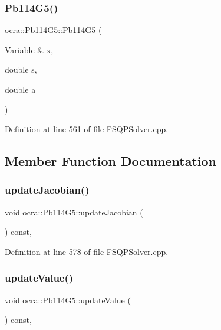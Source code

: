 \subsubsection{\texorpdfstring{Pb114\+G5()}{Pb114G5()}}
{\footnotesize\ttfamily ocra\+::\+Pb114\+G5\+::\+Pb114\+G5 (\begin{DoxyParamCaption}\item[{\hyperlink{classocra_1_1Variable}{Variable} \&}]{x,  }\item[{double}]{s,  }\item[{double}]{a }\end{DoxyParamCaption})\hspace{0.3cm}{\ttfamily [inline]}}



Definition at line 561 of file F\+S\+Q\+P\+Solver.\+cpp.



\subsection{Member Function Documentation}
\hypertarget{classocra_1_1Pb114G5_a8dc90051ef52688c0879a3d129d5bf84}{}\label{classocra_1_1Pb114G5_a8dc90051ef52688c0879a3d129d5bf84} 
\subsubsection{\texorpdfstring{update\+Jacobian()}{updateJacobian()}}
{\footnotesize\ttfamily void ocra\+::\+Pb114\+G5\+::update\+Jacobian (\begin{DoxyParamCaption}{ }\end{DoxyParamCaption}) const\hspace{0.3cm}{\ttfamily [inline]}, {\ttfamily [protected]}}



Definition at line 578 of file F\+S\+Q\+P\+Solver.\+cpp.

\hypertarget{classocra_1_1Pb114G5_a2a19291b7ef222254a018c0e25df8f57}{}\label{classocra_1_1Pb114G5_a2a19291b7ef222254a018c0e25df8f57} 
\subsubsection{\texorpdfstring{update\+Value()}{updateValue()}}
{\footnotesize\ttfamily void ocra\+::\+Pb114\+G5\+::update\+Value (\begin{DoxyParamCaption}{ }\end{DoxyParamCaption}) const\hspace{0.3cm}{\ttfamily [inline]}, {\ttfamily [protected]}}




